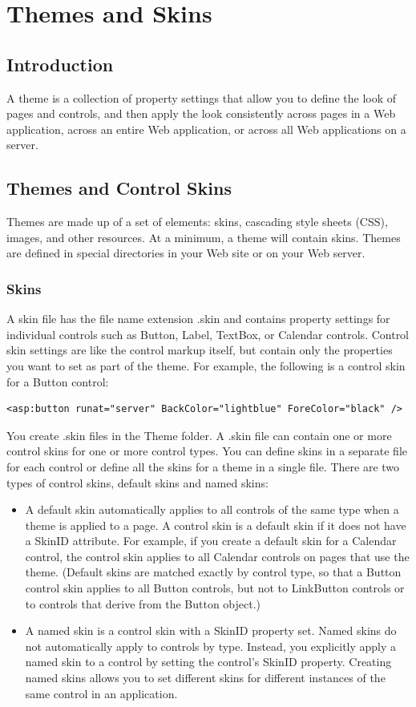 \chapter{Themes and Skins}
\section{Introduction}
A theme is a collection of property settings that allow you to define the look of pages and controls, and then apply the look consistently across pages in a Web application, across an entire Web application, or across all Web applications on a server.

\section{Themes and Control Skins}
Themes are made up of a set of elements: skins, cascading style sheets (CSS), images, and other resources. At a minimum, a theme will contain skins. Themes are defined in special directories in your Web site or on your Web server.

\subsection{Skins}
A skin file has the file name extension .skin and contains property settings for individual controls such as Button, Label, TextBox, or Calendar controls. Control skin settings are like the control markup itself, but contain only the properties you want to set as part of the theme. For example, the following is a control skin for a Button control:
\begin{lstlisting}
<asp:button runat="server" BackColor="lightblue" ForeColor="black" />
\end{lstlisting}
You create .skin files in the Theme folder. A .skin file can contain one or more control skins for one or more control types. You can define skins in a separate file for each control or define all the skins for a theme in a single file.
There are two types of control skins, default skins and named skins:
\begin{itemize}
	\item A default skin automatically applies to all controls of the same type when a theme is applied to a page. A control skin is a default skin if it does not have a SkinID attribute. For example, if you create a default skin for a Calendar control, the control skin applies to all Calendar controls on pages that use the theme. (Default skins are matched exactly by control type, so that a Button control skin applies to all Button controls, but not to LinkButton controls or to controls that derive from the Button object.)	
	\item A named skin is a control skin with a SkinID property set. Named skins do not automatically apply to controls by type. Instead, you explicitly apply a named skin to a control by setting the control's SkinID property. Creating named skins allows you to set different skins for different instances of the same control in an application.
\end{itemize}

